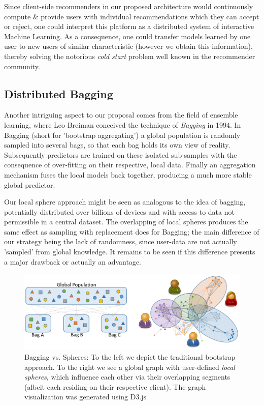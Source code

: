 \documentclass{llncs}
\begin{document}
Since client-side recommenders in our proposed architecture would continuously compute \& provide users with individual recommendations which they can accept or reject, one could interpret this platform as a distributed system of interactive Machine Learning. As a consequence, one could transfer models learned by one user to new users of similar characteristic (however we obtain this information), thereby solving the notorious \textit{cold start} problem well known in the recommender community.


\subsection{Distributed Bagging}
\label{ssect:dist_bag}

Another intriguing aspect to our proposal comes from the field of ensemble learning, where Leo Breiman conceived the technique of \textit{Bagging} \cite{breiman1996bagging} in 1994. In Bagging (short for 'bootstrap aggregating') a global population is randomly sampled into several bags, so that each bag holds its own view of reality. Subsequently predictors are trained on these isolated sub-samples with the consequence of over-fitting on their respective, local data. Finally an aggregation mechanism fuses the local models back together, producing a much more stable global predictor.

Our local sphere approach might be seen as analogous to the idea of bagging, potentially distributed over billions of devices and with access to data not permissible in a central dataset. The overlapping of local spheres produces the same effect as sampling with replacement does for Bagging; the main difference of our strategy being the lack of randomness, since user-data are not actually 'sampled' from global knowledge. It remains to be seen if this difference presents a major drawback or actually an advantage.

\begin{figure}[H]
	\begin{center}
		\includegraphics[width=1\textwidth]{figures/bagging_vs_local_sphere}
		\caption{Bagging vs. Spheres: To the left we depict the traditional bootstrap approach. To the right we see a global graph with user-defined \textit{local spheres}, which influence each other via their overlapping segments (albeit each residing on their respective client). The graph visualization was generated using D3.js \cite{zhu2013d3js}}
		\label{fig:bagging_vs_sphere}
	\end{center}
\end{figure}
\end{document}

